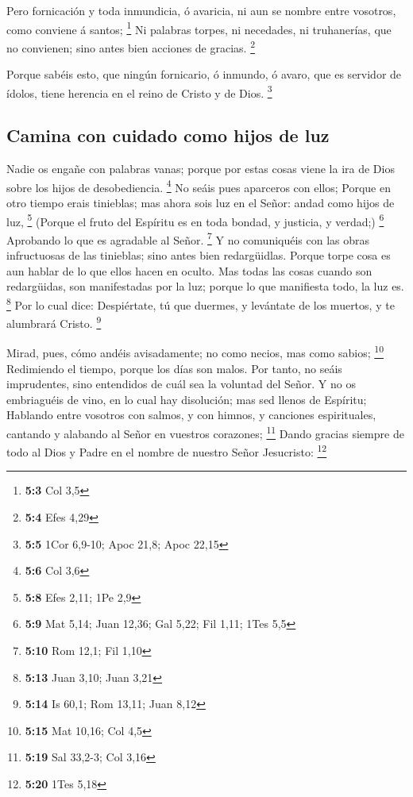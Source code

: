  Pero fornicación y toda inmundicia, ó avaricia, ni aun se
nombre entre vosotros, como conviene á santos; \footnote{\textbf{5:3}
  Col 3,5}  Ni palabras torpes, ni necedades, ni
truhanerías, que no convienen; sino antes bien acciones de gracias.
\footnote{\textbf{5:4} Efes 4,29}

 Porque sabéis esto, que ningún fornicario, ó inmundo, ó
avaro, que es servidor de ídolos, tiene herencia en el reino de Cristo y
de Dios. \footnote{\textbf{5:5} 1Cor 6,9-10; Apoc 21,8; Apoc 22,15}

\hypertarget{camina-con-cuidado-como-hijos-de-luz}{%
\subsection{Camina con cuidado como hijos de
luz}\label{camina-con-cuidado-como-hijos-de-luz}}

 Nadie os engañe con palabras vanas; porque por estas cosas
viene la ira de Dios sobre los hijos de desobediencia. \footnote{\textbf{5:6}
  Col 3,6}  No seáis pues aparceros con ellos; 
Porque en otro tiempo erais tinieblas; mas ahora sois luz en el Señor:
andad como hijos de luz, \footnote{\textbf{5:8} Efes 2,11; 1Pe 2,9}
 (Porque el fruto del Espíritu es en toda bondad, y
justicia, y verdad;) \footnote{\textbf{5:9} Mat 5,14; Juan 12,36; Gal
  5,22; Fil 1,11; 1Tes 5,5}  Aprobando lo que es agradable
al Señor. \footnote{\textbf{5:10} Rom 12,1; Fil 1,10}  Y no
comuniquéis con las obras infructuosas de las tinieblas; sino antes bien
redargüidlas.  Porque torpe cosa es aun hablar de lo que
ellos hacen en oculto.  Mas todas las cosas cuando son
redargüidas, son manifestadas por la luz; porque lo que manifiesta todo,
la luz es. \footnote{\textbf{5:13} Juan 3,10; Juan 3,21} 
Por lo cual dice: Despiértate, tú que duermes, y levántate de los
muertos, y te alumbrará Cristo. \footnote{\textbf{5:14} Is 60,1; Rom
  13,11; Juan 8,12}

 Mirad, pues, cómo andéis avisadamente; no como necios, mas
como sabios; \footnote{\textbf{5:15} Mat 10,16; Col 4,5} 
Redimiendo el tiempo, porque los días son malos.  Por
tanto, no seáis imprudentes, sino entendidos de cuál sea la voluntad del
Señor.  Y no os embriaguéis de vino, en lo cual hay
disolución; mas sed llenos de Espíritu;  Hablando entre
vosotros con salmos, y con himnos, y canciones espirituales, cantando y
alabando al Señor en vuestros corazones; \footnote{\textbf{5:19} Sal
  33,2-3; Col 3,16}  Dando gracias siempre de todo al Dios
y Padre en el nombre de nuestro Señor Jesucristo: \footnote{\textbf{5:20}
  1Tes 5,18}

